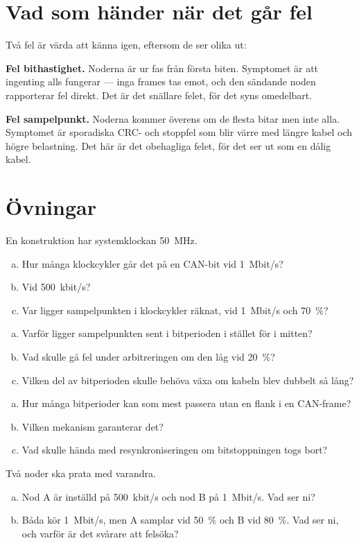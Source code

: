 \section{Vad som händer när det går fel}

Två fel är värda att känna igen, eftersom de ser olika ut:

\textbf{Fel bithastighet.} Noderna är ur fas från första biten. Symptomet är att ingenting alls
fungerar --- inga frames tas emot, och den sändande noden rapporterar fel direkt. Det är det
snällare felet, för det syns omedelbart.

\textbf{Fel sampelpunkt.} Noderna kommer överens om de flesta bitar men inte alla. Symptomet är
sporadiska CRC- och stoppfel som blir värre med längre kabel och högre belastning. Det här är
det obehagliga felet, för det ser ut som en dålig kabel.

\section*{Övningar}

\label{ex:5:1}
En konstruktion har systemklockan 50~MHz.
\begin{enumerate}[a)]
  \item Hur många klockcykler går det på en CAN-bit vid 1~Mbit/s?
  \item Vid 500~kbit/s?
  \item Var ligger sampelpunkten i klockcykler räknat, vid 1~Mbit/s och 70~\%?
\end{enumerate}

\label{ex:5:2}
\begin{enumerate}[a)]
  \item Varför ligger sampelpunkten sent i bitperioden i stället för i mitten?
  \item Vad skulle gå fel under arbitreringen om den låg vid 20~\%?
  \item Vilken del av bitperioden skulle behöva växa om kabeln blev dubbelt så lång?
\end{enumerate}

\label{ex:5:3}
\begin{enumerate}[a)]
  \item Hur många bitperioder kan som mest passera utan en flank i en CAN-frame?
  \item Vilken mekanism garanterar det?
  \item Vad skulle hända med resynkroniseringen om bitstoppningen togs bort?
\end{enumerate}

\label{ex:5:4}
Två noder ska prata med varandra.
\begin{enumerate}[a)]
  \item Nod A är inställd på 500~kbit/s och nod B på 1~Mbit/s. Vad ser ni?
  \item Båda kör 1~Mbit/s, men A samplar vid 50~\% och B vid 80~\%. Vad ser ni, och varför är
    det svårare att felsöka?
\end{enumerate}
